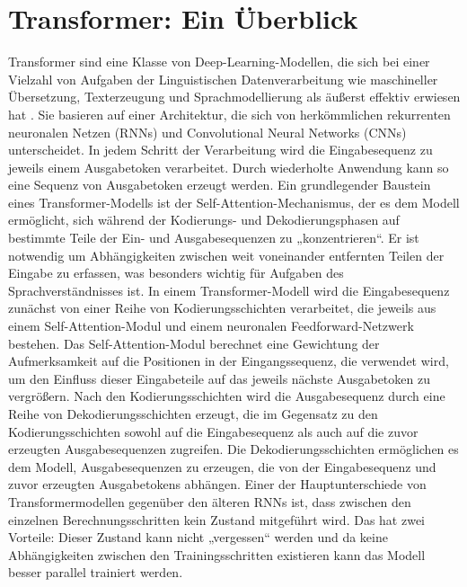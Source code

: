\section{Transformer: Ein Überblick}
\label{subsec:Foundations:Transformer}
Transformer \cite{transformers} sind eine Klasse von Deep-Learning-Modellen, die sich bei einer Vielzahl von Aufgaben der Linguistischen Datenverarbeitung wie maschineller Übersetzung, Text\-er\-zeugung und Sprachmodellierung als äußerst effektiv erwiesen hat \cite{transformers,bert,FewShotLearners,gpt4}.
Sie basieren auf einer Architektur, die sich von herkömmlichen rekurrenten neuronalen Netzen (RNNs) und Convolutional Neural Networks (CNNs) unterscheidet.
In jedem Schritt der Verarbeitung wird die Eingabesequenz zu jeweils einem Ausgabetoken verarbeitet.
Durch wiederholte Anwendung kann so eine Sequenz von Ausgabetoken erzeugt werden.
Ein grundlegender Baustein eines Transformer-Modells ist der Self-Attention-Mechanismus, der es dem Modell ermöglicht, sich während der Kodierungs- und Dekodierungsphasen auf bestimmte Teile der Ein- und Ausgabesequenzen zu „konzentrieren“.
Er ist notwendig um Abhängigkeiten zwischen weit voneinander entfernten Teilen der Eingabe zu erfassen, was besonders wichtig für Aufgaben des Sprachverständnisses ist.
In einem Transformer-Modell wird die Eingabesequenz zunächst von einer Reihe von Kodierungsschichten verarbeitet, die jeweils aus einem Self-Attention-Modul und einem neuronalen Feedforward-Netzwerk bestehen.
Das Self-Attention-Modul berechnet eine Gewichtung der Aufmerksamkeit auf die Positionen in der Eingangssequenz, die verwendet wird, um den Einfluss dieser Eingabeteile auf das jeweils nächste Ausgabetoken zu vergrößern.
Nach den Kodierungsschichten wird die Ausgabesequenz durch eine Reihe von Dekodierungsschichten erzeugt, die im Gegensatz zu den Kodierungsschichten sowohl auf die Eingabesequenz als auch auf die zuvor erzeugten Ausgabesequenzen zugreifen.
Die Dekodierungsschichten ermöglichen es dem Modell, Ausgabesequenzen zu erzeugen, die von der Eingabesequenz und zuvor erzeugten Ausgabetokens abhängen.
Einer der Hauptunterschiede von Transformermodellen gegenüber den älteren RNNs ist, dass zwischen den einzelnen Berechnungsschritten kein Zustand mitgeführt wird.
Das hat zwei Vorteile: Dieser Zustand kann nicht „vergessen“ werden und da keine Abhängigkeiten zwischen den Trainingsschritten existieren kann das Modell besser parallel trainiert werden.

